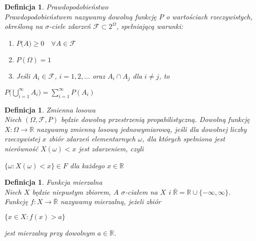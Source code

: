 \documentclass[12pt,a4paper]{report}
\newtheorem{definition}[theorem]{Definicja}
\begin{document}
\begin{definition}{Prawdopodobieństwo \cite[w oparciu o rozdział 1.1]{krysicki1999}\\}
Prawdopodobieństwem nazywamy dowolną funkcję $P$ o wartościach rzeczywistych, określoną na $\sigma$-ciele zdarzeń $\mathcal{F} \subset 2^\Omega$, spełniającą warunki: \\
\begin{enumerate}
\item $\textit{P(A)} \geq 0 \quad \forall{\textit{A} \in \mathcal{F}}$
\item $\textit{P}(\Omega) = 1$
\item Jeśli $\textit{A}_{i} \in \mathcal{F}$, $i= 1, 2, ...$ oraz $A_{i} \cap A_{j}$ dla $i \neq j$, to 
\end{enumerate}
\begin{center}
$P \Big(\bigcup\limits_{i=1}^{\infty} A_{i} \Big)=\sum_{i=1}^{\infty} P(A_{i}) $\\
\end{center}
\end{definition}

\begin{definition}{Zmienna losowa \cite[Rozdział 2.1]{krysicki1999}\\}
Niech $(\Omega, \mathcal{F}, P)$ będzie dowolną przestrzenią propabilistyczną. Dowolną funkcję $\textit{X} : \Omega \rightarrow \mathbb{R}$ nazywamy zmienną losową jednowymiarową, jeśli dla dowolnej liczby rzeczywistej $x$ zbiór zdarzeń elementarnych $\omega$, dla których spełniona jest nierówność $X(\omega)< x$ jest zdarzeniem, czyli 
\begin{center}
$\{\omega: X(\omega) < x \} \in \textit{F}$ dla każdego $x \in \mathbb{R}$\\
\end{center}
\end{definition}


\begin{definition}{Funkcja mierzalna \cite[w oparciu o rozdział 8.2]{rudnicki2006}\\}
Niech $X$ będzie niepustym zbiorem, $A$  $\sigma$-ciałem na $X$ i $\overline{\mathbb{R}} = \mathbb{R} \cup \{-\infty, \infty \}$. Funkcję $f: X \rightarrow \overline{\mathbb{R}}$ nazywamy mierzalną, jeżeli zbiór
\begin{center}
$\{ x \in X: f(x) > a \}$
\end{center}
jest mierzalny przy dowolnym $a \in \mathbb{R}$.\\
\end{definition}
\end{document}
